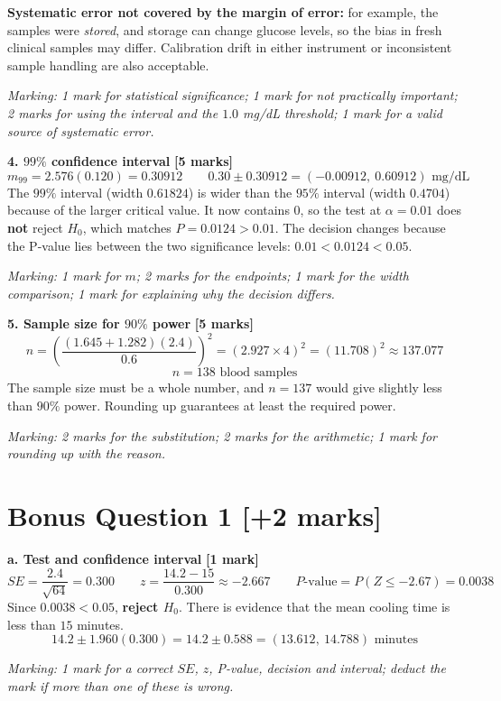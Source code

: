 \documentclass[10pt,letterpaper]{article}
\newcommand{\partmarks}[1]{\hfill\textbf{[#1 marks]}}
\newcommand{\allocation}[1]{\par\smallskip\textit{Marking: #1}\par}
\begin{document}
\textbf{Systematic error not covered by the margin of error:} for example, the samples were \emph{stored}, and storage can change glucose levels, so the bias in fresh clinical samples may differ. Calibration drift in either instrument or inconsistent sample handling are also acceptable.

\allocation{1 mark for statistical significance; 1 mark for not practically important; 2 marks for using the interval and the $1.0$ mg/dL threshold; 1 mark for a valid source of systematic error.}

\textbf{4. $99\%$ confidence interval} \partmarks{5}
$$m_{99}=2.576(0.120)=0.30912 \qquad 0.30\pm0.30912=\boxed{(-0.00912,\ 0.60912)\text{ mg/dL}}$$
The $99\%$ interval (width $0.61824$) is wider than the $95\%$ interval (width $0.4704$) because of the larger critical value. It now contains $0$, so the test at $\alpha=0.01$ does \textbf{not} reject $H_0$, which matches $P=0.0124>0.01$. The decision changes because the P-value lies between the two significance levels: $0.01<0.0124<0.05$.

\allocation{1 mark for $m$; 2 marks for the endpoints; 1 mark for the width comparison; 1 mark for explaining why the decision differs.}

\textbf{5. Sample size for $90\%$ power} \partmarks{5}
$$n=\left(\frac{(1.645+1.282)(2.4)}{0.6}\right)^2=(2.927\times4)^2=(11.708)^2\approx137.077$$
$$\boxed{n=138\text{ blood samples}}$$
The sample size must be a whole number, and $n=137$ would give slightly less than $90\%$ power. Rounding up guarantees at least the required power.

\allocation{2 marks for the substitution; 2 marks for the arithmetic; 1 mark for rounding up with the reason.}

\newpage
\section*{Bonus Question 1 \hfill [+2 marks]}

\textbf{a. Test and confidence interval} \hfill\textbf{[1 mark]}
$$SE=\frac{2.4}{\sqrt{64}}=0.300 \qquad z=\frac{14.2-15}{0.300}\approx-2.667 \qquad P\text{-value}=P(Z\le-2.67)=\boxed{0.0038}$$
Since $0.0038<0.05$, \textbf{reject $H_0$}. There is evidence that the mean cooling time is less than $15$ minutes.
$$14.2\pm1.960(0.300)=14.2\pm0.588=\boxed{(13.612,\ 14.788)\text{ minutes}}$$

\allocation{1 mark for a correct $SE$, $z$, P-value, decision and interval; deduct the mark if more than one of these is wrong.}
\end{document}
